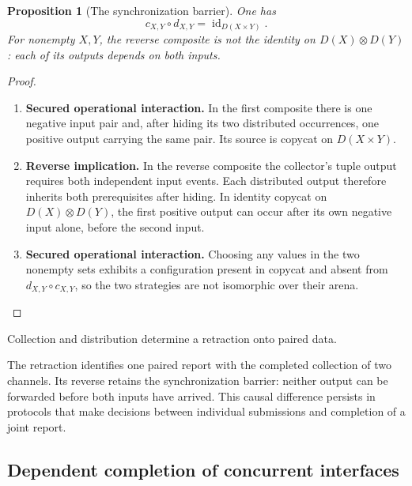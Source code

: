 \documentclass[11pt,a4paper]{article}
\numberwithin{equation}{section}
\newtheorem{proposition}[theorem]{Proposition}
\theoremstyle{definition}
\theoremstyle{remark}
\theoremstyle{plain}
\providecommand{\id}{\mathop{\mathrm{id}}}
\begin{document}
\begin{proposition}[The synchronization barrier]
\label{prop:egt-barrier}
One has
\[
 c_{X,Y}\circ d_{X,Y}=\operatorname{id}_{D(X\times Y)}.
\]
For nonempty $X,Y$, the reverse composite is not the identity on
$D(X)\otimes D(Y)$: each of its outputs depends on both inputs.
\end{proposition}
\begin{proof}
\leavevmode
\begin{enumerate}[label=\textup{(\arabic*)},leftmargin=*,itemsep=4pt,topsep=3pt]
  \item \textbf{Secured operational interaction.} In the first composite there is one negative input pair and, after hiding its
two distributed occurrences, one positive output carrying the same pair. Its
source is copycat on $D(X\times Y)$.
  \item \textbf{Reverse implication.} In the reverse composite the collector's
tuple output requires both independent input events. Each distributed output
therefore inherits both prerequisites after hiding. In identity copycat on
$D(X)\otimes D(Y)$, the first positive output can occur after its own negative
input alone, before the second input.
  \item \textbf{Secured operational interaction.} Choosing any values in the two nonempty
sets exhibits a configuration present in copycat and absent from
$d_{X,Y}\circ c_{X,Y}$, so the two strategies are not isomorphic over their
arena.
\end{enumerate}
\end{proof}

\noindent Collection and distribution determine a retraction onto paired data.
\begin{center}
\end{center}

The retraction identifies one paired report with the completed
collection of two channels. Its reverse retains the synchronization
barrier: neither output can be forwarded before both inputs have arrived.
This causal difference persists in protocols that make decisions between
individual submissions and completion of a joint report.

\subsection{Dependent completion of concurrent interfaces}
\label{sec:egt-dependent-semantics}
\end{document}
